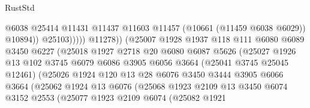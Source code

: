 \begin{lexlean}{RustStd}
\begin{coremodule}
                                          @6038
                                          @25414
                                          @11431
                                          @11437
                                          @11603
                                          @11457
                                          (@10661 (@11459 @6038 @6029))
                                          @10894))
                                      @25103)))))
                            @11278))
                        (@25007
                          @1928
                          @1937
                          @118
                          @111
                          @6080
                          @6089
                          @3450
                          @6227
                          (@25018
                            @1927
                            @2718
                            @20
                            @6080
                            @6087
                            @5626
                            (@25027
                              @1926
                              @13
                              @102
                              @3745
                              @6079
                              @6086
                              @3905
                              @6056
                              @3664
                              (@25041 @3745 @25045 @12461)
                              (@25026
                                @1924
                                @120
                                @13
                                @28
                                @6076
                                @3450
                                @3444
                                @3905
                                @6066
                                @3664
                                (@25062
                                  @1924
                                  @13
                                  @6076
                                  (@25068
                                    @1923
                                    @2109
                                    @13
                                    @3450
                                    @6074
                                    @3152
                                    @2553
                                    (@25077
                                      @1923
                                      @2109
                                      @6074
                                      (@25082
                                        @1921

\end{coremodule}
\end{lexlean}
